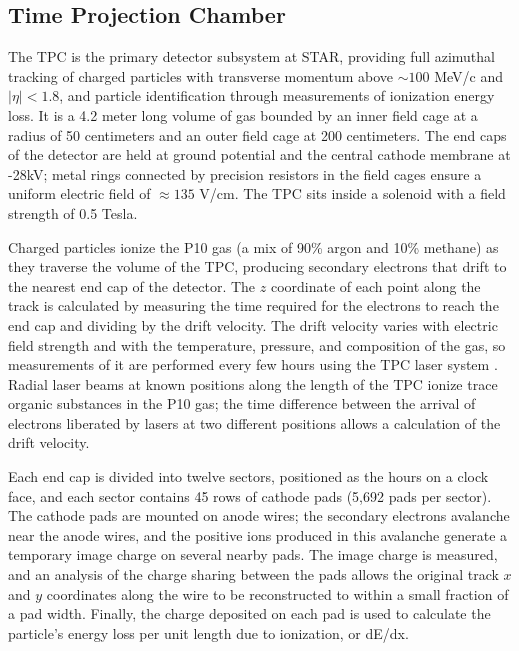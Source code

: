 
\subsection{Time Projection Chamber}

The TPC \cite{Anderson:2003ur} is the primary detector subsystem at STAR,
providing full azimuthal tracking of charged particles with transverse
momentum above $\sim 100$ MeV/c and $|\eta| < 1.8$, and particle
identification through measurements of ionization energy loss. It is a 4.2
meter long volume of gas bounded by an inner field cage at a radius of 50
centimeters and an outer field cage at 200 centimeters. The end caps of the
detector are held at ground potential and the central cathode membrane at
-28kV; metal rings connected by precision resistors in the field cages ensure
a uniform electric field of $\approx 135$ V/cm. The TPC sits inside a solenoid
with a field strength of 0.5 Tesla.

Charged particles ionize the P10 gas (a mix of 90\% argon and 10\% methane) as
they traverse the volume of the TPC, producing secondary electrons that drift to
the nearest end cap of the detector. The $z$ coordinate of each point along the
track is calculated by measuring the time required for the electrons to reach
the end cap and dividing by the drift velocity. The drift velocity varies with
electric field strength and with the temperature, pressure, and composition of
the gas, so measurements of it are performed every few hours using the TPC laser
system \cite{Abele:2003aa}. Radial laser beams at known positions along the
length of the TPC ionize trace organic substances in the P10 gas; the time
difference between the arrival of electrons liberated by lasers at two different
positions allows a calculation of the drift velocity.

Each end cap is divided into twelve sectors, positioned as the hours on a
clock face, and each sector contains 45 rows of cathode pads (5,692 pads per
sector). The cathode pads are mounted on anode wires; the secondary electrons
avalanche near the anode wires, and the positive ions produced in this
avalanche generate a temporary image charge on several nearby pads. The image
charge is measured, and an analysis of the charge sharing between the pads
allows the original track $x$ and $y$ coordinates along the wire to be
reconstructed to within a small fraction of a pad width. Finally, the charge
deposited on each pad is used to calculate the particle's energy loss per unit
length due to ionization, or dE/dx.

